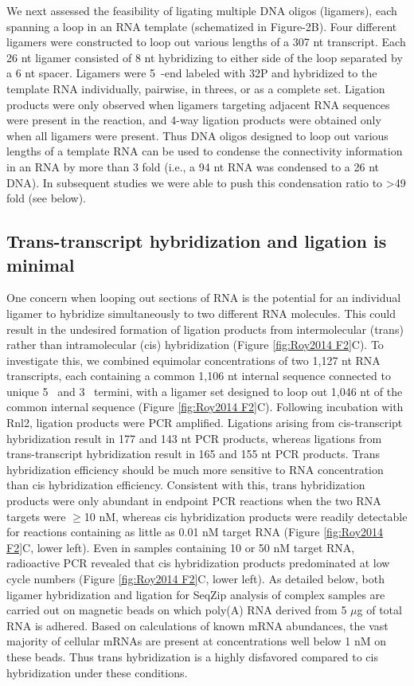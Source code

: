 {		We next assessed the feasibility of ligating multiple DNA oligos (ligamers), each spanning a loop in an RNA template (schematized in Figure-2B). Four different ligamers were constructed to loop out various lengths of a 307 nt transcript. Each 26 nt ligamer consisted of 8 nt hybridizing to either side of the loop separated by a 6 nt spacer. Ligamers were 5\textprime~-end labeled with 32P and hybridized to the template RNA individually, pairwise, in threes, or as a complete set. Ligation products were only observed when ligamers targeting adjacent RNA sequences were present in the reaction, and 4-way ligation products were obtained only when all ligamers were present. Thus DNA oligos designed to loop out various lengths of a template RNA can be used to condense the connectivity information in an RNA by more than 3 fold (i.e., a 94 nt RNA was condensed to a 26 nt DNA). In subsequent studies we were able to push this condensation ratio to >49 fold (see below).

	\subsection{Trans-transcript hybridization and ligation is minimal}

		One concern when looping out sections of RNA is the potential for an individual ligamer to hybridize simultaneously to two different RNA molecules. This could result in the undesired formation of ligation products from intermolecular (trans) rather than intramolecular (cis) hybridization (Figure \ref{fig:Roy2014 F2}C). To investigate this, we combined equimolar concentrations of two 1,127 nt RNA transcripts, each containing a common 1,106 nt internal sequence connected to unique 5\textprime~ and 3\textprime~ termini, with a ligamer set designed to loop out 1,046 nt of the common internal sequence (Figure \ref{fig:Roy2014 F2}C). Following incubation with Rnl2, ligation products were PCR amplified. Ligations arising from cis-transcript hybridization result in 177 and 143 nt PCR products, whereas ligations from trans-transcript hybridization result in 165 and 155 nt PCR products. Trans hybridization efficiency should be much more sensitive to RNA concentration than cis hybridization efficiency. Consistent with this, trans hybridization products were only abundant in endpoint PCR reactions when the two RNA targets were $\ge$10 nM, whereas cis hybridization products were readily detectable for reactions containing as little as 0.01 nM target RNA (Figure \ref{fig:Roy2014 F2}C, lower left). Even in samples containing 10 or 50 nM target RNA, radioactive PCR revealed that cis hybridization products predominated at low cycle numbers (Figure \ref{fig:Roy2014 F2}C, lower left). As detailed below, both ligamer hybridization and ligation for SeqZip analysis of complex samples are carried out on magnetic beads on which poly(A) RNA derived from 5 $\mu$g of total RNA is adhered. Based on calculations of known mRNA abundances, the vast majority of cellular mRNAs are present at concentrations well below 1 nM on these beads. Thus trans hybridization is a highly disfavored compared to cis hybridization under these conditions.

}
